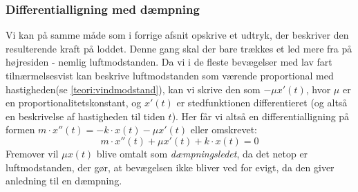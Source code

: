 \subsubsection{Differentialligning med dæmpning}\label{teori: Opstilling af ligning med dampning}
Vi kan på samme måde som i forrige afsnit opskrive et udtryk, der beskriver den resulterende kraft på loddet. 
Denne gang skal der bare trækkes et led mere fra på højresiden - nemlig luftmodstanden. 
Da vi i de fleste bevægelser med lav fart tilnærmelsesvist kan beskrive luftmodstanden som værende proportional med hastigheden\footnotemark(se \ref{teori:vindmodstand}), kan vi skrive den som $- \mu x'(t)$, hvor $\mu$ er en proportionalitetskonstant, og $x'(t)$ er stedfunktionen differentieret (og altså en beskrivelse af hastigheden til tiden $t$).
Her får vi altså en differentialligning på formen $m\cdot x''(t)=-k\cdot x(t)-\mu x'(t)$ eller omskrevet:
$$m\cdot x''(t)+\mu x'(t)+k\cdot x(t)=0$$
Fremover vil $\mu x(t)$ blive omtalt som \textit{dæmpningsledet}, da det netop er luftmodstanden, der gør, at bevægelsen ikke bliver ved for evigt, da den giver anledning til en dæmpning. 
